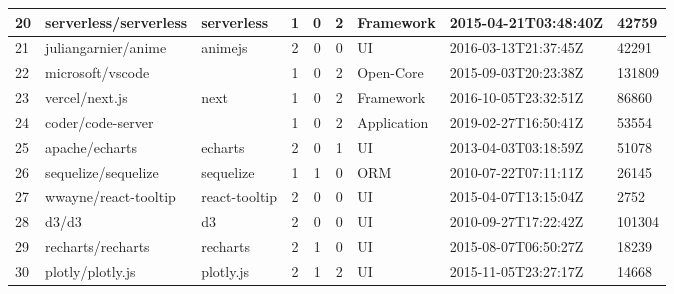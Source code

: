 \begin{landscape}
\begin{table}[h]
{\begin{tabular}{lllccclll}
                20 & serverless/serverless     & serverless            & 1                      & 0                 & 2                 & Framework         & 2015-04-21T03:48:40Z & 42759          \\ \hline
                21 & juliangarnier/anime       & animejs               & 2                      & 0                 & 0                 & UI                & 2016-03-13T21:37:45Z & 42291          \\ \hline
                22 & microsoft/vscode          &                       & 1                      & 0                 & 2                 & Open-Core         & 2015-09-03T20:23:38Z & 131809         \\ \hline
                23 & vercel/next.js            & next                  & 1                      & 0                 & 2                 & Framework         & 2016-10-05T23:32:51Z & 86860          \\ \hline
                24 & coder/code-server         &                       & 1                      & 0                 & 2                 & Application       & 2019-02-27T16:50:41Z & 53554          \\ \hline
                25 & apache/echarts            & echarts               & 2                      & 0                 & 1                 & UI                & 2013-04-03T03:18:59Z & 51078          \\ \hline
                26 & sequelize/sequelize       & sequelize             & 1                      & 1                 & 0                 & ORM               & 2010-07-22T07:11:11Z & 26145          \\ \hline
                27 & wwayne/react-tooltip      & react-tooltip         & 2                      & 0                 & 0                 & UI                & 2015-04-07T13:15:04Z & 2752           \\ \hline
                28 & d3/d3                     & d3                    & 2                      & 0                 & 0                 & UI                & 2010-09-27T17:22:42Z & 101304         \\ \hline
                29 & recharts/recharts         & recharts              & 2                      & 1                 & 0                 & UI                & 2015-08-07T06:50:27Z & 18239          \\ \hline
                30 & plotly/plotly.js          & plotly.js             & 2                      & 1                 & 2                 & UI                & 2015-11-05T23:27:17Z & 14668          \\ \hline

\end{tabular}}
\end{table}
\end{landscape}
